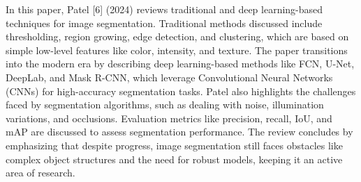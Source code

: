 In this paper, Patel [6] (2024) reviews traditional and deep learning-based techniques for image segmentation. Traditional methods discussed include thresholding, region growing, edge detection, and clustering, which are based on simple low-level features like color, intensity, and texture. The paper transitions into the modern era by describing deep learning-based methods like FCN, U-Net, DeepLab, and Mask R-CNN, which leverage Convolutional Neural Networks (CNNs) for high-accuracy segmentation tasks. Patel also highlights the challenges faced by segmentation algorithms, such as dealing with noise, illumination variations, and occlusions. Evaluation metrics like precision, recall, IoU, and mAP are discussed to assess segmentation performance. The review concludes by emphasizing that despite progress, image segmentation still faces obstacles like complex object structures and the need for robust models, keeping it an active area of research.